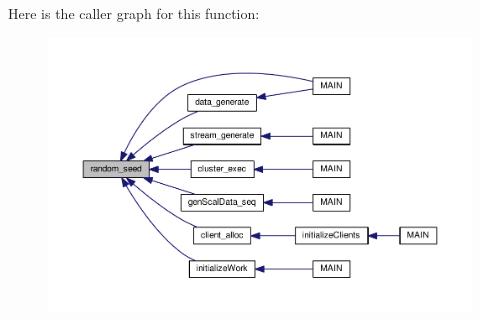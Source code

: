 Here is the caller graph for this function\-:
\nopagebreak
\begin{figure}[H]
\begin{center}
\leavevmode
\includegraphics[width=350pt]{rstm_2rstm-dev_2stamp-0_89_810_2lib_2random_8h_a4863f841babe7ce3664a4e4bed6180ab_icgraph}
\end{center}
\end{figure}


